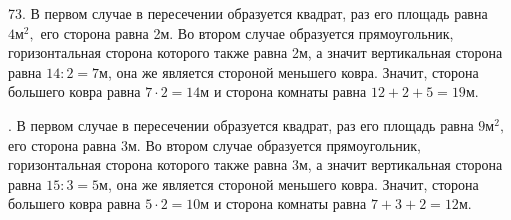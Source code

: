 73. В первом случае в пересечении образуется квадрат, раз его площадь равна $4\text{м}^2,$ его сторона равна 2м. Во втором случае образуется прямоугольник, горизонтальная сторона которого также равна 2м, а значит вертикальная сторона равна $14:2=7$м, она же является стороной меньшего ковра. Значит, сторона большего ковра равна $7\cdot2=14$м и сторона комнаты равна $12+2+5=19$м.
\begin{center}
\begin{figure}[ht!]
\end{figure}
\end{center}
\newpage
{}. В первом случае в пересечении образуется квадрат, раз его площадь равна $9\text{м}^2,$ его сторона равна 3м. Во втором случае образуется прямоугольник, горизонтальная сторона которого также равна 3м, а значит вертикальная сторона равна $15:3=5$м, она же является стороной меньшего ковра. Значит, сторона большего ковра равна $5\cdot2=10$м и сторона комнаты равна $7+3+2=12$м.
\begin{center}
\begin{figure}[ht!]
\end{figure}
\end{center}
